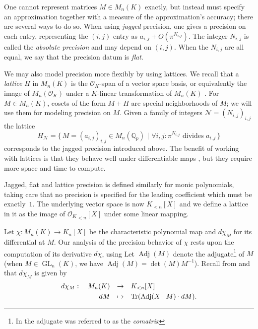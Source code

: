 \documentclass[sigconf]{acmart}
\DeclareMathOperator{\GL}{GL}
\DeclareMathOperator{\tr}{Tr}
\DeclareMathOperator{\adj}{Adj}
\newcommand{\Q}{\mathbb Q}
\newcommand{\Qp}{\Q_p}
\newcommand{\OK}{\mathcal{O}_K}
\newcommand{\famN}{\mathcal{N}}
\theoremstyle{definition}
\begin{document}
One cannot represent
matrices $M \in M_n(K)$ exactly, but instead must specify an approximation
together with a measure of the approximation's accuracy; there are several ways to do so.
When using \emph{jagged} precision, one gives a precision on each entry,
representing the $(i,j)$ entry as $a_{i,j} + O(\pi^{N_{i,j}})$. The integer $N_{i,j}$ 
is called the \emph{absolute precision} and may depend on $(i,j)$.
When the $N_{i,j}$ are all equal, we say that the precision datum is 
\emph{flat}.

We may also model precision more flexibly by using lattices.  We 
recall that a \emph{lattice} $H$ in $M_n(K)$ is the $\OK$-span of a vector
space basis, or equivalently the image of $M_n(\OK)$ under a 
$K$-linear transformation of $M_n(K)$ \cite[\S 2.2]{caruso-roe-vaccon:14a}.
For $M \in M_n(K)$, cosets of the form $M + H$ are special
neighborhoods of $M$; we will use them for modeling precision on $M$. 
Given a family of integers $\famN = (N_{i,j})_{i,j}$ the lattice
\[
H_{\famN} = \big\{ \, M = (a_{i,j})_{i,j} \in M_n(\Qp) \,\, | \,\, \forall i,\!j\!:
\pi^{N_{i,j}} \text{ divides } a_{i,j} \, \big\}
\]
corresponds to the jagged precision introduced above.
The benefit of working with lattices is that they behave well under 
differentiable maps \cite[Lemma 3.4]{caruso-roe-vaccon:14a}, but they
require more space and time to compute. 

Jagged, flat and lattice precision is defined similarly for monic polynomials, 
taking care that no precision is specified for the leading 
coefficient which must be exactly~$1$. The underlying 
vector space is now $K_{<n}[X]$ and we define a lattice in it as the
image of ${\OK}_{<n}[X]$ under some linear mapping.

Let $\chi : M_n(K) \to K_n[X]$ be the characteristic polynomial map
and $d \chi_M$ for its differential at $M$.
Our analysis of the precision behavior of $\chi$ rests upon
the computation of its derivative $d\chi$, using \cite[Lemma 3.4]{caruso-roe-vaccon:14a}
Let $\adj(M)$ denote the adjugate\footnote{In \cite{caruso-roe-vaccon:14a,caruso-roe-vaccon:15a} the adjugate was referred to as the \emph{comatrix}} of $M$ (when $M \in \GL_n(K)$,
we have $\adj(M) {=} \det(M) M^{-1}$).  Recall from
\cite[Appendix B]{caruso-roe-vaccon:14a} and \cite[\S 3.3]{caruso-roe-vaccon:15a}
that $d\chi_M$ is given by
\begin{equation} \label{eq:dchi}
\begin{array}{rcl}
d\chi_M: \quad M_n(K) & \to & K_{<n}[X] \smallskip \\
 dM & \mapsto & \tr(\adj(X{-}M) \cdot dM).
\end{array}
\end{equation}
\end{document}

